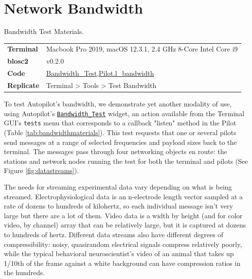 \section{Network Bandwidth}
\label{sec:bandwidth}

\begin{margintable}[2.5cm]
\caption{Bandwidth Test Materials.}
\label{tab:bandwidthmaterials}
\noindent\begin{tabularx}{\linewidth}{lX}%
\toprule
\textbf{Terminal} & Macbook Pro 2019, macOS 12.3.1, 2.4 GHz 8-Core Intel Core i9 \\
\textbf{blosc2} & v0.2.0 \\
\textbf{Code} & \href{https://github.com/auto-pi-lot/autopilot/blob/v0.5.0/autopilot/gui/menus/tests.py}{Bandwidth\_Test},\break \href{https://github.com/auto-pi-lot/autopilot/blob/d140908da11bf8c64511c7920f303734ca103fa1/autopilot/core/pilot.py\#L460}{Pilot.l\_bandwidth} \\
\textbf{Replicate} & Terminal > Tools > Test Bandwidth \\
\bottomrule
\end{tabularx}
\end{margintable}

To test Autopilot's bandwidth, we demonstrate yet another modality of use, using Autopilot's \href{https://docs.auto-pi-lot.com/en/v0.5.0/gui/menus.html#autopilot.gui.menus.tests.Bandwidth_Test}{\texttt{Bandwidth\_Test}} widget, an action available from the Terminal GUI's \texttt{tests} menu that corresponds to a callback "listen" method in the Pilot (Table \ref{tab:bandwidthmaterials}). This test requests that one or several pilots send messages at a range of selected frequencies and payload sizes back to the terminal. The messages pass through four networking objects en route: the stations and network nodes running the test for both the terminal and pilots (See Figure \ref{fig:datastreams}). 

The needs for streaming experimental data vary depending on what is being streamed. Electrophysiological data is an n-electrode length vector sampled at a rate of dozens to hundreds of kilohertz, so each individual message isn't very large but there are a lot of them. Video data is a width by height (and for color video, by channel) array that can be relatively large, but it is captured at dozens to hundreds of hertz. Different data streams also have different degrees of compressibility: noisy, quasirandom electrical signals compress relatively poorly, while the typical behavioral neuroscientist's video of an animal that takes up 1/10th of the frame against a white background can have compression ratios in the hundreds.

